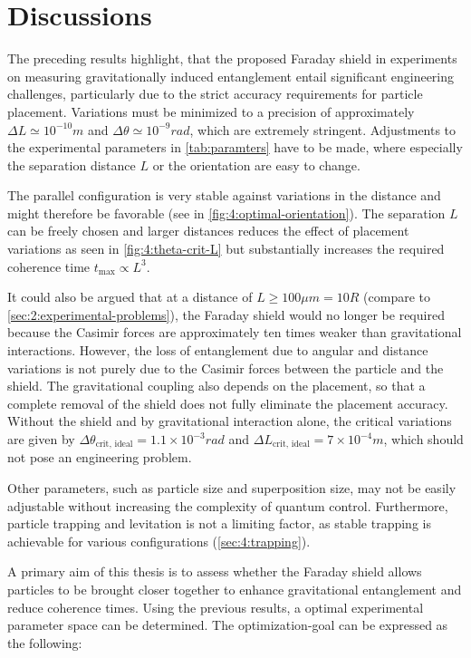 \section{Discussions}\label{sec:4:discussion}
The preceding results highlight, that the proposed Faraday shield in experiments on measuring gravitationally induced entanglement entail significant engineering challenges, particularly due to the strict accuracy requirements for particle placement.
Variations must be minimized to a precision of approximately $\Delta L \simeq 10^{-10}\si{m}$ and $\Delta \theta \simeq 10^{-9}\si{rad}$, which are extremely stringent.
Adjustments to the experimental parameters in \cref{tab:paramters} have to be made, where especially the separation distance $L$ or the orientation are easy to change.

The parallel configuration is very stable against variations in the distance and might therefore be favorable (see in \cref{fig:4:optimal-orientation}).
The separation $L$ can be freely chosen and larger distances reduces the effect of placement variations as seen in \cref{fig:4:theta-crit-L} but substantially increases the required coherence time $t_\mathrm{max} \propto L^3$.

It could also be argued that at a distance of $L \geq 100\si{\mu m} = 10 R$ (compare to \cref{sec:2:experimental-problems}), the Faraday shield would no longer be required because the Casimir forces are approximately ten times weaker than gravitational interactions.
However, the loss of entanglement due to angular and distance variations is not purely due to the Casimir forces between the particle and the shield.
The gravitational coupling also depends on the placement, so that a complete removal of the shield does not fully eliminate the placement accuracy.
Without the shield and by gravitational interaction alone, the critical variations are given by $\Delta \theta_\mathrm{crit,\,ideal} = 1.1 \times 10^{-3}\si{rad}$ and $\Delta L_\mathrm{crit,\,ideal} = 7\times 10^{-4}\si{m}$, which should not pose an engineering problem.

Other parameters, such as particle size and superposition size, may not be easily adjustable without increasing the complexity of quantum control.
Furthermore, particle trapping and levitation is not a limiting factor, as stable trapping is achievable for various configurations (\cref{sec:4:trapping}).

A primary aim of this thesis is to assess whether the Faraday shield allows particles to be brought closer together to enhance gravitational entanglement and reduce coherence times. 
Using the previous results, a optimal experimental parameter space can be determined.
The optimization-goal can be expressed as the following:


